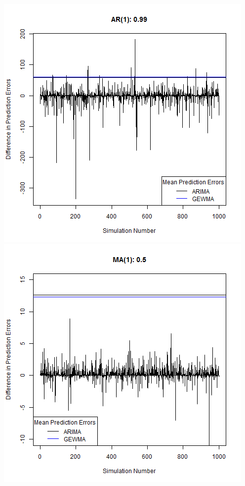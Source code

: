 \documentclass[12pt]{article}
\begin{document}
\begin{center}
\includegraphics[scale=.5]{plot_3.png}\\
\includegraphics[scale=.5]{plot_4.png}\\

\end{center}
\end{document}
